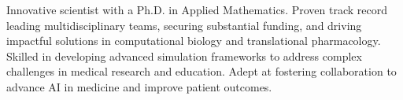 %
%
%

\par{
Innovative scientist with a Ph.D. in Applied Mathematics. Proven track record leading multidisciplinary teams, securing substantial funding, and driving impactful solutions in computational biology and translational pharmacology. Skilled in developing advanced simulation frameworks to address complex challenges in medical research and education. Adept at fostering collaboration to advance AI in medicine and improve patient outcomes. 
}